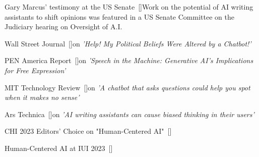 \begin{talks}

    \award
    {Gary Marcus' testimony at the US Senate}{}{\normalfont ~[\href{https://www.judiciary.senate.gov/committee-activity/hearings/oversight-of-ai-rules-for-artificial-intelligence}{\small{\websiteSymbol}}]}{Work on the potential of AI writing assistants to shift opinions was featured in a US Senate Committee on the Judiciary hearing on Oversight of A.I.}

    \award
    {Wall Street Journal}{}{\normalfont ~[\href{https://www.wsj.com/articles/chatgpt-bard-bing-ai-political-beliefs-151a0fe4}{\small{\websiteSymbol}}]}{on \textit{'Help! My Political Beliefs Were Altered by a Chatbot!'}}

    \award
    {PEN America Report}{}{\normalfont ~[\href{https://pen.org/report/speech-in-the-machine/}{\small{\websiteSymbol}}]}{on \textit{'Speech in the Machine: Generative AI's Implications for Free Expression'}}

    \award
    {MIT Technology Review}{}{\normalfont ~[\href{https://www.technologyreview.com/2023/04/28/1072430/a-chatbot-that-asks-questions-could-help-you-spot-when-it-makes-no-sense/}{\small{\websiteSymbol}}]}{on \textit{'A chatbot that asks questions could help you spot when it makes no sense'}}

    \award
    {Ars Technica}{}{\normalfont ~[\href{https://arstechnica.com/science/2023/05/ai-writing-assistants-can-cause-biased-thinking-in-their-users/}{\small{\websiteSymbol}}]}{on \textit{'AI writing assistants can cause biased thinking in their users'}}

    \award
    {CHI 2023 Editors' Choice on "Human-Centered AI"}{}{\normalfont ~[\href{https://medium.com/human-centered-ai/chi-2023-editors-choice-359ffae60706}{\small{\websiteSymbol}}]}{}

    \award
    {Human-Centered AI at IUI 2023}{}{\normalfont ~[\href{https://medium.com/human-centered-ai/human-centered-ai-at-iui-2023-b94d14828df6}{\small{\websiteSymbol}}]}{}


\end{talks}
\vspace{-3mm}
